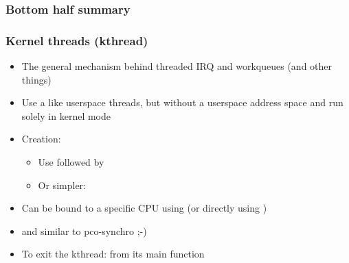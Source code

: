 \begin{frame}[fragile]
  \frametitle{Bottom half summary}
\centering
\begin{table}
\end{table}
\end{frame}

\begin{frame}
  \frametitle{Kernel threads (kthread)}
  \begin{itemize}
  \item The general mechanism behind threaded IRQ and workqueues (and other things)
  \item Use a  like userspace threads, but without a userspace address space
        and run solely in kernel mode
  \item Creation:
    \begin{itemize}
    \item Use  followed by 
    \item Or simpler: 
    \end{itemize}
  \item Can be bound to a specific CPU using 
        (or directly using )
  \item {} and  similar to pco-synchro ;-)
  \item To exit the kthread:  from its main function
  \end{itemize}
\end{frame}

